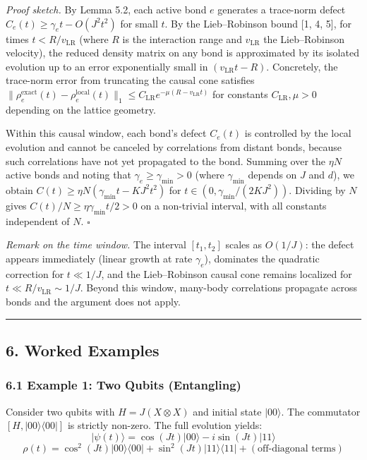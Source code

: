 \documentclass[
]{article}
\begin{document}
\emph{Proof sketch.} By Lemma 5.2, each active bond \(e\) generates a
trace-norm defect \(C_e(t) \geq \gamma_e t - O(J^2 t^2)\) for small
\(t\). By the Lieb--Robinson bound {[}1, 4, 5{]}, for times
\(t < R / v_{\text{LR}}\) (where \(R\) is the interaction range and
\(v_{\text{LR}}\) the Lieb--Robinson velocity), the reduced density
matrix on any bond is approximated by its isolated evolution up to an
error exponentially small in \((v_{\text{LR}} t - R)\). Concretely, the
trace-norm error from truncating the causal cone satisfies
\(\|\rho_e^{\text{exact}}(t) - \rho_e^{\text{local}}(t)\|_1 \leq C_{\text{LR}} e^{-\mu(R - v_{\text{LR}} t)}\)
for constants \(C_{\text{LR}}, \mu > 0\) depending on the lattice
geometry.

Within this causal window, each bond's defect \(C_e(t)\) is controlled
by the local evolution and cannot be canceled by correlations from
distant bonds, because such correlations have not yet propagated to the
bond. Summing over the \(\eta N\) active bonds and noting that
\(\gamma_e \geq \gamma_{\min} > 0\) (where \(\gamma_{\min}\) depends on
\(J\) and \(d\)), we obtain
\(C(t) \geq \eta N (\gamma_{\min} t - KJ^2 t^2)\) for
\(t \in (0, \gamma_{\min}/(2KJ^2))\). Dividing by \(N\) gives
\(C(t)/N \geq \eta \gamma_{\min} t / 2 > 0\) on a non-trivial interval,
with all constants independent of \(N\). \(\square\)

\emph{Remark on the time window.} The interval \([t_1, t_2]\) scales as
\(O(1/J)\): the defect appears immediately (linear growth at rate
\(\gamma_e\)), dominates the quadratic correction for \(t \ll 1/J\), and
the Lieb--Robinson causal cone remains localized for
\(t \ll R/v_{\text{LR}} \sim 1/J\). Beyond this window, many-body
correlations propagate across bonds and the argument does not apply.

\begin{center}\rule{0.5\linewidth}{0.5pt}\end{center}

\subsection{6. Worked Examples}\label{worked-examples}

\subsubsection{6.1 Example 1: Two Qubits
(Entangling)}\label{example-1-two-qubits-entangling}

Consider two qubits with \(H = J(X \otimes X)\) and initial state
\(|{00}\rangle\). The commutator \([H, |00\rangle\langle00|]\) is
strictly non-zero. The full evolution yields:
\[|\psi(t)\rangle = \cos(Jt)|{00}\rangle - i\sin(Jt)|{11}\rangle\]
\[\rho(t) = \cos^2(Jt)|{00}\rangle\langle{00}| + \sin^2(Jt)|{11}\rangle\langle{11}| + (\text{off-diagonal terms})\]
\end{document}

